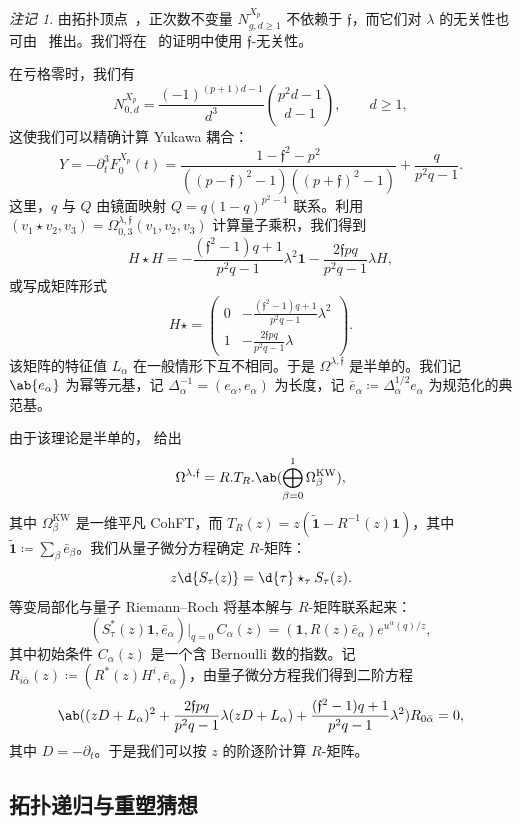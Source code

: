 \documentclass{amsart}
\theoremstyle{definition}
\theoremstyle{remark}
\newtheorem{rmk}[thm]{注记}
\theoremstyle{plain}
\theoremstyle{definition}
\theoremstyle{remark}
\newcommand{\mf}[1]{\mathfrak{#1}}
\newcommand{\mr}[1]{\mathrm{#1}}
\newcommand{\wt}[1]{\widetilde{#1}}
\newcommand{\1}{\mathbf{1}}
\newcommand{\2}{\mathbf{2}}
\newcommand{\3}{\mathbf{3}}
\begin{document}
\begin{rmk}
    由拓扑顶点~\cite{LLLZ2009}，正次数不变量 \(N^{X_p}_{g,d\geq1}\) 不依赖于 \(\mf{f}\)，而它们对 \(\lambda\) 的无关性也可由~ 推出。我们将在~ 的证明中使用 \(\mf{f}\)-无关性。
\end{rmk}

在亏格零时，我们有
\[ N^{X_p}_{0,d} = \frac{(-1)^{(p+1)d-1}}{d^3}\binom{p^2d-1}{d-1}, \qquad d \geq 1, \]
这使我们可以精确计算 Yukawa 耦合：
\[ Y = -\partial_t^3 F_0^{X_p}(t) = \frac{1-\mf{f}^2-p^2}{((p-\mf{f})^2-1)((p+\mf{f})^2-1)} + \frac{q}{p^2q-1}. \]
这里，\(q\) 与 \(Q\) 由镜面映射 \(Q = q(1-q)^{p^2-1}\) 联系。利用 \((v_1 \star v_2, v_3) = \Omega^{\lambda,\mf{f}}_{0,3}(v_1,v_2,v_3)\) 计算量子乘积，我们得到
\[ H \star H = -\frac{(\mf{f}^2-1)q+1}{p^2q-1}\lambda^2 \1 - \frac{2\mf{f}pq}{p^2q-1}\lambda H, \]
或写成矩阵形式
\[ H \star = \begin{pmatrix} 0 & -\frac{(\mf{f}^2-1)q+1}{p^2q-1}\lambda^2 \\ 1 & -\frac{2\mf{f}pq}{p^2q-1}\lambda \end{pmatrix}. \]
该矩阵的特征值 \(L_{\alpha}\) 在一般情形下互不相同。于是 \(\Omega^{\lambda,\mf{f}}\) 是半单的。我们记 \(\ab\{e_{\alpha}\}\) 为幂等元基，记 \(\Delta_{\alpha}^{-1} = (e_{\alpha},e_{\alpha})\) 为长度，记 \(\bar{e}_{\alpha} \coloneqq \Delta_{\alpha}^{1/2}e_{\alpha}\) 为规范化的典范基。

由于该理论是半单的， 给出
\[ \Omega^{\lambda,\mf{f}} = R.T_R.\ab(\bigoplus_{\beta=0}^1 \Omega^{\mr{KW}}_{\beta}), \]
其中 \(\Omega^{\mr{KW}}_{\beta}\) 是一维平凡 CohFT，而 \(T_R(z) = z(\wt{\1}-R^{-1}(z)\1)\)，其中 \(\wt{\1} \coloneqq \sum_{\beta}\bar{e}_{\beta}\)。我们从量子微分方程确定 \(R\)-矩阵：
\[ z \d{S_{\tau}(z)} = \d{\tau} \star_{\tau} S_{\tau}(z). \]
等变局部化与量子 Riemann--Roch 将基本解与 \(R\)-矩阵联系起来：
\[ (S^*_{\tau}(z)\1, \bar{e}_{\alpha})\big|_{q=0}\, C_{\alpha}(z) = (\1, R(z)\bar{e}_{\alpha})e^{u^{\alpha}(q)/z}, \]
其中初始条件 \(C_{\alpha}(z)\) 是一个含 Bernoulli 数的指数。记 \(R_{i\bar{\alpha}}(z) \coloneqq (R^*(z)H^i, \bar{e}_{\alpha})\)，由量子微分方程我们得到二阶方程
\[ \ab( (zD+L_{\alpha})^2 + \frac{2\mf{f}pq}{p^2q-1}\lambda(zD+L_{\alpha}) + \frac{(\mf{f}^2-1)q+1}{p^2q-1}\lambda^2 )R_{0\bar{\alpha}} = 0, \]
其中 \(D = -\partial_t\)。于是我们可以按 \(z\) 的阶逐阶计算 \(R\)-矩阵。

\subsection{拓扑递归与重塑猜想}%
\label{sub:Topological recursion and the remodeling conjecture}
\end{document}
